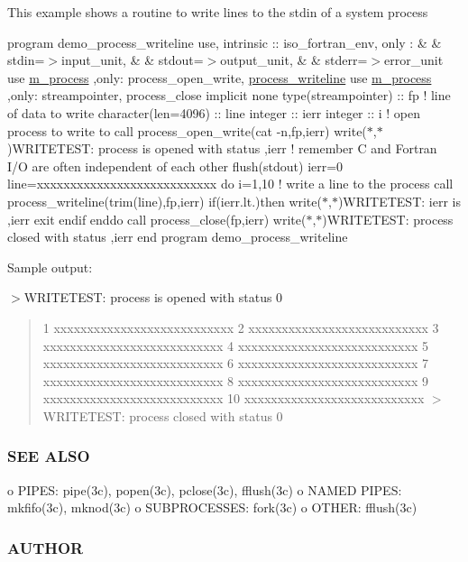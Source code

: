 This example shows a routine to write lines to the stdin of a system process

program demo\+\_\+process\+\_\+writeline use, intrinsic \+:\+: iso\+\_\+fortran\+\_\+env, only \+: \& \& stdin=$>$input\+\_\+unit, \& \& stdout=$>$output\+\_\+unit, \& \& stderr=$>$error\+\_\+unit use \mbox{\hyperlink{namespacem__process}{m\+\_\+process}} ,only\+: process\+\_\+open\+\_\+write, \mbox{\hyperlink{interfacem__process_1_1process__writeline}{process\+\_\+writeline}} use \mbox{\hyperlink{namespacem__process}{m\+\_\+process}} ,only\+: streampointer, process\+\_\+close implicit none type(streampointer) \+:\+: fp ! line of data to write character(len=4096) \+:\+: line integer \+:\+: ierr integer \+:\+: i ! open process to write to call process\+\_\+open\+\_\+write(\textquotesingle{}cat -\/n\textquotesingle{},fp,ierr) write($\ast$,$\ast$)\textquotesingle{}W\+R\+I\+T\+E\+T\+E\+ST\+: process is opened with status \textquotesingle{},ierr ! remember C and Fortran I/O are often independent of each other flush(stdout) ierr=0 line=\textquotesingle{}xxxxxxxxxxxxxxxxxxxxxxxxxxx\textquotesingle{} do i=1,10 ! write a line to the process call process\+\_\+writeline(trim(line),fp,ierr) if(ierr.\+lt.)then write($\ast$,$\ast$)\textquotesingle{}W\+R\+I\+T\+E\+T\+E\+ST\+: ierr is \textquotesingle{},ierr exit endif enddo call process\+\_\+close(fp,ierr) write($\ast$,$\ast$)\textquotesingle{}W\+R\+I\+T\+E\+T\+E\+ST\+: process closed with status \textquotesingle{},ierr end program demo\+\_\+process\+\_\+writeline

Sample output\+:

$>$W\+R\+I\+T\+E\+T\+E\+ST\+: process is opened with status 0 \begin{quote}
1 xxxxxxxxxxxxxxxxxxxxxxxxxxx 2 xxxxxxxxxxxxxxxxxxxxxxxxxxx 3 xxxxxxxxxxxxxxxxxxxxxxxxxxx 4 xxxxxxxxxxxxxxxxxxxxxxxxxxx 5 xxxxxxxxxxxxxxxxxxxxxxxxxxx 6 xxxxxxxxxxxxxxxxxxxxxxxxxxx 7 xxxxxxxxxxxxxxxxxxxxxxxxxxx 8 xxxxxxxxxxxxxxxxxxxxxxxxxxx 9 xxxxxxxxxxxxxxxxxxxxxxxxxxx 10 xxxxxxxxxxxxxxxxxxxxxxxxxxx $>$W\+R\+I\+T\+E\+T\+E\+ST\+: process closed with status 0 \end{quote}


\subsubsection*{S\+EE A\+L\+SO}

o P\+I\+P\+ES\+: pipe(3c), popen(3c), pclose(3c), fflush(3c) o N\+A\+M\+ED P\+I\+P\+ES\+: mkfifo(3c), mknod(3c) o S\+U\+B\+P\+R\+O\+C\+E\+S\+S\+ES\+: fork(3c) o O\+T\+H\+ER\+: fflush(3c) \subsubsection*{A\+U\+T\+H\+OR}


